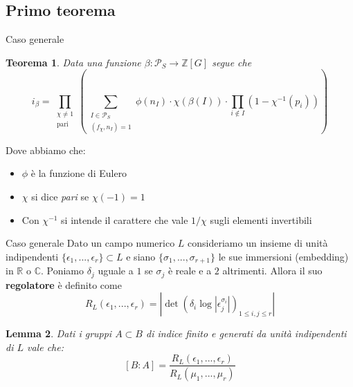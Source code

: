 \documentclass{beamer}
\theoremstyle{plain}
\newtheorem{teo}{Teorema}[section]
\newtheorem{lem}[teo]{Lemma}
\theoremstyle{remark}
\theoremstyle{definition}
\newcommand{\PS}{\mathcal{P}_S}
\newcommand{\Z}{\mathbb{Z}}
\newcommand{\C}{\mathbb{C}}
\newcommand{\R}{\mathbb{R}}
\begin{document}
\subsection{Primo teorema}
	\begin{frame}{Caso generale}
		\begin{teo}
				Data una funzione $ \beta : \PS \to \Z [G] $ segue che
					\begin{equation}
					\label{eq:idx1}
						i_\beta = \prod_{ \substack{\chi \neq 1 \\ \text{pari}}} \left( \sum_{\substack{ I \in \PS \\ (f_\chi , n_I) = 1}} \phi (n_I) \cdot \chi (\beta (I)) \cdot \prod_{i \not \in  I} (1- \chi^{-1} (p_i)) \right) 
					\end{equation}
		\end{teo}\pause
		Dove abbiamo che:
		\begin{itemize}
			\item $\phi$ è la funzione di Eulero 
			\item $\chi$ si dice \textit{pari} se $ \chi (-1) = 1 $
			\item Con $ \chi^{-1} $ si intende il carattere che vale $ 1/\chi $ sugli elementi invertibili
		\end{itemize}
	\end{frame}	
	
	\begin{frame}{Caso generale}
		Dato un campo numerico $ L $ consideriamo un insieme di unità indipendenti $ \{\epsilon_1 , ... , \epsilon_r\} \subset L$ e siano $ \{ \sigma_1 , ... , \sigma_{r+1} \} $ le sue immersioni (embedding) in $ \R $ o $ \C $. Poniamo $ \delta_j $ uguale a $ 1 $ se $ \sigma_j $ è reale e a $ 2 $ altrimenti. Allora il suo \textbf{regolatore} è definito come 
		\[ 	R_L(\epsilon_1 , ... , \epsilon_r) = | \det (\delta_i \log | \epsilon_j ^{\sigma_i}|)_{1\leq i,j\leq r} | \]
		\pause
		\begin{lem}
				\label{lem:index_reg}
				Dati i gruppi $ A \subset B $ di indice finito e generati da unità indipendenti di $ L $ vale che:
				\begin{equation} \label{eq:index_reg}
					[B:A]= \frac{R_L(\epsilon_1 , ... , \epsilon_r) }{R_L(\mu_1 , ... , \mu_r) }
				\end{equation}
			\end{lem}
	\end{frame}
	
\end{document}
